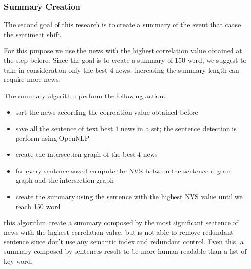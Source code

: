 \subsubsection*{Summary Creation}
The second goal of this research is to create a summary of the event that cause the sentiment shift. 

For this purpose we use the news with the highest correlation value obtained at the step before.
Since the goal is to create a summary of 150 word, we suggest to take in consideration only the best 4 news. Increasing the summary length can require more news.

The summary algorithm perform the following action:
\begin{itemize}
	\item sort the news according the correlation value obtained before
	\item save all the sentence of text best $4$ news in a set; the sentence detection is perform using OpenNLP
	\item create the intersection graph of the best $4$ news
	\item for every sentence saved compute the NVS between the sentence n-gram graph and the intersection graph
	\item create the summary using the sentence with the highest NVS value until we reach 150 word
\end{itemize}

this algorithm create a summary composed by the most significant sentence of news with the highest correlation value, but is not able to remove redundant sentence since don't use any semantic index and redundant control. Even this, a summary composed by sentences result to be more human readable than a list of key word.
